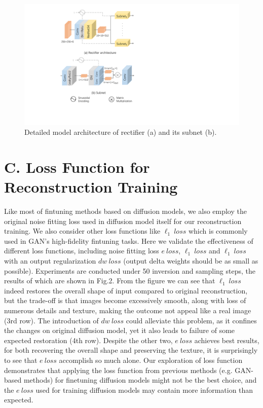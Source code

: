 \documentclass[letterpaper]{article} %
\begin{document}
\begin{figure}[t]
    \centering
    \includegraphics[width=1\columnwidth]{Figs/fig9_row.pdf}
    \caption{Detailed model architecture of rectifier (a) and its subnet (b).}
    \label{fig9}
\end{figure}

\section{C. Loss Function for Reconstruction Training}

Like most of fintuning methods based on diffusion models, we also employ the original noise fitting loss used in diffusion model \cite{ho2020denoising} itself for our reconstruction training. 
We also consider other loss functions like $\ell_1 ~loss$ which is commonly used in GAN's high-fidelity fintuning tasks. 
Here we validate the effectiveness of different loss functions, including noise fitting loss $e ~loss$, $\ell_1 ~loss$ and $\ell_1 ~loss$ with an output regularization $dw ~loss$ (output delta weights should be as small as possible).
Experiments are conducted under 50 inversion and sampling steps, the results of which are shown in Fig.2. From the figure we can see that $\ell_1 ~loss$ indeed restores the overall shape of input compared to original reconstruction, but the trade-off is that images become excessively smooth, along with loss of numerous details and texture, making the outcome not appeal like a real image (3rd row). The introduction of $dw ~loss$ could alleviate this problem, as it confines the changes on original diffusion model, yet it also leads to failure of some expected restoration (4th row). Despite the other two, $e ~loss$ achieves best results, for both recovering the overall shape and preserving the texture, 
it is surprisingly to see that $e ~loss$ accomplish so much alone.
Our exploration of loss function demonstrates that applying the loss function from previous methods (e.g. GAN-based methods) for finetuning diffusion models might not be the best choice, and the $e ~loss$ used for training diffusion models may contain more information than expected.
\end{document}

